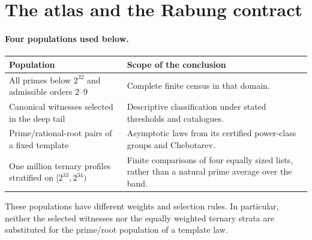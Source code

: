 \documentclass[11pt]{article}
\theoremstyle{definition}\newtheorem{definition}[theorem]{Definition}
\begin{document}
\section{The atlas and the Rabung contract}\label{sec:atlas}

\paragraph{Four populations used below.}
\begin{center}\small
\begin{tabular}{@{}P{6.0cm}P{8.4cm}@{}}\toprule
Population & Scope of the conclusion \\ \midrule
All primes below $2^{32}$ and admissible orders $2$--$9$
& Complete finite census in that domain. \\ \addlinespace
Canonical witnesses selected in the deep tail
& Descriptive classification under stated thresholds and catalogues. \\ \addlinespace
Prime/rational-root pairs of a fixed template
& Asymptotic laws from its certified power-class groups and Chebotarev. \\ \addlinespace
One million ternary profiles stratified on $[2^{33},2^{34})$
& Finite comparisons of four equally sized lists, rather than a natural
prime average over the band. \\ \bottomrule
\end{tabular}
\end{center}
These populations have different weights and selection rules. In
particular, neither the selected witnesses nor the equally weighted
ternary strata are substituted for the prime/root population of a
template law.
\end{document}
